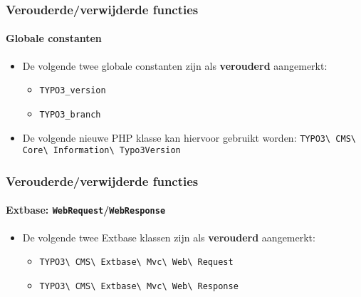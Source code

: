 
\begin{frame}[fragile]
	\frametitle{Verouderde/verwijderde functies}
	\framesubtitle{Globale constanten}

	\lstset{basicstyle=\smaller\ttfamily}

	\begin{itemize}
		\item De volgende twee globale constanten zijn als \textbf{verouderd} aangemerkt:

			\begin{itemize}
				\item \texttt{TYPO3\_version}
				\item \texttt{TYPO3\_branch}
			\end{itemize}

		\item De volgende nieuwe PHP klasse kan hiervoor gebruikt worden:\newline
			\small
				\texttt{TYPO3\textbackslash
					CMS\textbackslash
					Core\textbackslash
					Information\textbackslash
					Typo3Version}\normalsize

	\end{itemize}

\end{frame}


\begin{frame}[fragile]
	\frametitle{Verouderde/verwijderde functies}
	\framesubtitle{Extbase: \texttt{WebRequest}/\texttt{WebResponse}}

	\begin{itemize}
		\item De volgende twee Extbase klassen zijn als \textbf{verouderd} aangemerkt:
			\begin{itemize}
				\item \texttt{TYPO3\textbackslash
					CMS\textbackslash
					Extbase\textbackslash
					Mvc\textbackslash
					Web\textbackslash
					Request}
				\item \texttt{TYPO3\textbackslash
					CMS\textbackslash
					Extbase\textbackslash
					Mvc\textbackslash
					Web\textbackslash
					Response}
			\end{itemize}

	\end{itemize}

\end{frame}

